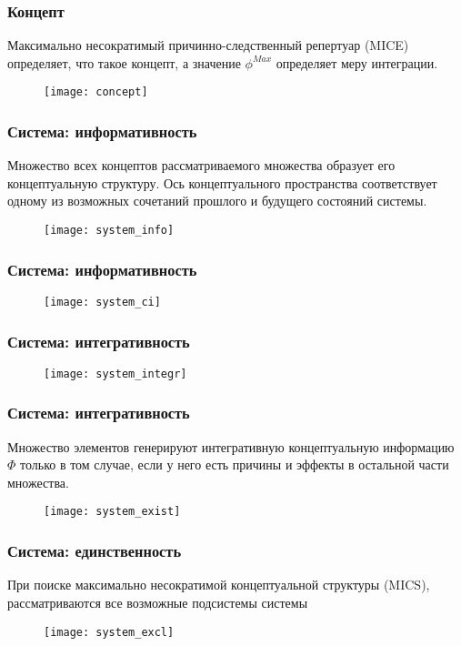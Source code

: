 \documentclass[default]{beamer}
\begin{document}
	\begin{frame}
		\frametitle{Концепт}
		Максимально несократимый причинно-следственный репертуар (MICE) определяет, что такое концепт, а значение $\phi^{Max}$ определяет меру интеграции.
		\begin{figure}
			\texttt{[image: concept]}
		\end{figure}
	\end{frame}

	\begin{frame}
		\frametitle{Система: информативность}
		Множество всех концептов рассматриваемого множества образует его концептуальную структуру. Ось концептуального пространства соответствует одному из возможных сочетаний прошлого и будущего состояний системы.
		\begin{figure}
			\texttt{[image: system\_info]}
		\end{figure}
	\end{frame}

	\begin{frame}
		\frametitle{Система: информативность}

		\begin{figure}
			\texttt{[image: system\_ci]}
		\end{figure}
	\end{frame}		
	
	\begin{frame}
		\frametitle{Система: интегративность}
		
		\begin{figure}
			\texttt{[image: system\_integr]}
		\end{figure}
	\end{frame}	
	
	\begin{frame}
		\frametitle{Система: интегративность}
		
		Множество элементов генерируют интегративную концептуальную информацию $\Phi$ только в том случае, если у него есть причины и эффекты в остальной части множества.
		\begin{figure}
			\texttt{[image: system\_exist]}
		\end{figure}
	\end{frame}		
	
	\begin{frame}
		\frametitle{Система: единственность}
		
		При поиске максимально несократимой концептуальной структуры (MICS), рассматриваются все возможные подсистемы системы
		\begin{figure}
			\texttt{[image: system\_excl]}
		\end{figure}
	\end{frame}	
	
\end{document}
